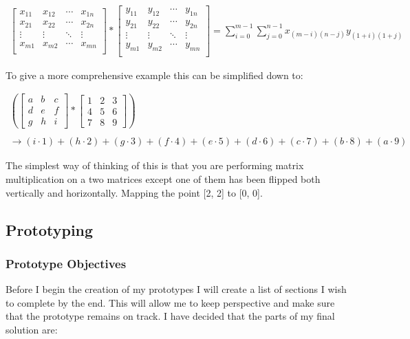 \begin{FlushLeft}
            \begin{gather*}
            {\displaystyle {\begin{bmatrix}x_{11}&x_{12}&\cdots &x_{1n}\\x_{21}&x_{22}&\cdots &x_{2n}\\\vdots &\vdots &\ddots &\vdots \\x_{m1}&x_{m2}&\cdots &x_{mn}\\\end{bmatrix}}*{\begin{bmatrix}y_{11}&y_{12}&\cdots &y_{1n}\\y_{21}&y_{22}&\cdots &y_{2n}\\\vdots &\vdots &\ddots &\vdots \\y_{m1}&y_{m2}&\cdots &y_{mn}\\\end{bmatrix}}=\sum _{i=0}^{m-1}\sum _{j=0}^{n-1}x_{(m-i)(n-j)}y_{(1+i)(1+j)}}
            \end{gather*} \bk

            To give a more comprehensive example this can be simplified down to:

            \begin{gather*}
                \displaystyle \left({\begin{bmatrix}a&b&c\\d&e&f\\g&h&i\end{bmatrix}}*{\begin{bmatrix}1&2&3\\4&5&6\\7&8&9\end{bmatrix}}\right)\\  \\
                \rightarrow{} (i\cdot 1)+(h\cdot 2)+(g\cdot 3)+(f\cdot 4)+(e\cdot 5)+(d\cdot 6)+(c\cdot 7)+(b\cdot 8)+(a\cdot 9)
            \end{gather*}

            \bk
            The simplest way of thinking of this is that you are performing matrix multiplication on a two matrices except one of them has been flipped both vertically and horizontally. Mapping the point [2, 2] to [0, 0].

        \subsection{Prototyping}
        \subsubsection{Prototype Objectives} 
        Before I begin the creation of my prototypes I will create a list of sections I wish to complete by the end. This will allow me to keep perspective and make sure that the prototype remains on track. I have decided that the parts of my final solution are:
        

\end{FlushLeft}
